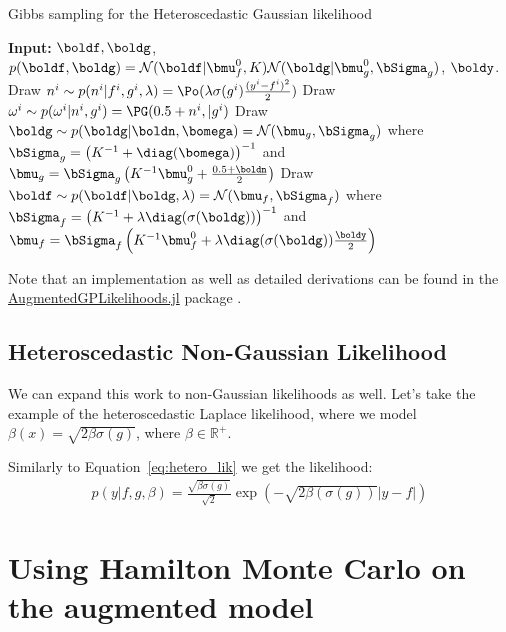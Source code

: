 \begin{algorithm}[H]
    \caption{Gibbs sampling for the Heteroscedastic Gaussian likelihood}
    \begin{algorithmic}
        \State \textbf{Input:} $\boldf,\boldg$, $p(\boldf,\boldg) = \mathcal{N}(\boldf|\bmu^0_f, K)\mathcal{N}(\boldg|\bmu^0_g,\bSigma_g)$, $\boldy$.
            \State Draw $n^i \sim p(n^i|f^i, g^i, \lambda) = \Po(\lambda \sigma(g^i) \frac{(y^i - f^i)^2}{2})$
            \State Draw $\omega^i \sim p(\omega^i|n^i,g^i) = \PG(0.5 + n^i, |g^i)$
            \State Draw $\boldg \sim p(\boldg|\boldn, \bomega) = \mathcal{N}(\bmu_g,\bSigma_g)$
            \State \quad where $\bSigma_g=  \left(K^{-1} + \diag(\bomega)\right)^{-1}$ and $\bmu_g = \bSigma_g\left(K^{-1}\bmu^0_g + \frac{0.5 + \boldn}{2}\right)$
            \State Draw $\boldf \sim p(\boldf | \boldg, \lambda) = \mathcal{N}(\bmu_f,\bSigma_f)$
            \State \quad where $\bSigma_f = \left(K^{-1} + \lambda\diag(\sigma(\boldg))\right)^{-1}$ and $\bmu_f = \bSigma_f\left(K^{-1}\bmu_f^0 + \lambda\diag(\sigma(\boldg))\frac{\boldy}{2}\right)$
        \EndFor
    \end{algorithmic}
\end{algorithm}

Note that an implementation as well as detailed derivations can be found in the \href{https://github.com/JuliaGaussianProcesses/AugmentedGPLikelihoods.jl}{AugmentedGPLikelihoods.jl} package \cite{theo_galy_fajou_2022_6347022}.
\subsection{Heteroscedastic Non-Gaussian Likelihood}

We can expand this work to non-Gaussian likelihoods as well.
Let's take the example of the heteroscedastic Laplace likelihood, where we model $\beta(x) = \sqrt{2\beta \sigma(g)}$, where $\beta \in \mathbb{R}^+$.

Similarly to Equation~\ref{eq:hetero_lik} we get the likelihood:
\begin{align*}
    p(y|f,g,\beta) = \frac{\sqrt{\beta\sigma(g)}}{\sqrt{2}}\exp\left(-\sqrt{2\beta(\sigma(g))}|y-f|\right)
    \label{eq:hetero_lik_laplace}
\end{align*}

\section{Using Hamilton Monte Carlo on the augmented model}


